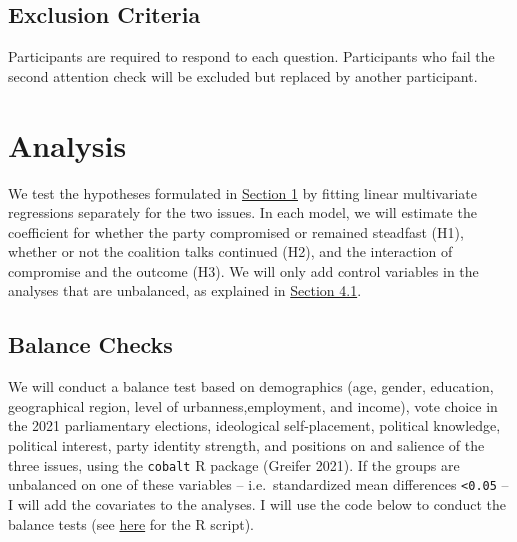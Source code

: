 \documentclass[]{article}
\begin{document}
\hypertarget{exclusion-criteria}{%
\subsection{Exclusion Criteria}\label{exclusion-criteria}}

Participants are required to respond to each question. Participants who
fail the second attention check will be excluded but replaced by another
participant.

\hypertarget{analysis}{%
\section{Analysis}\label{analysis}}

We test the hypotheses formulated in
\protect\hyperlink{expectations}{Section 1} by fitting linear
multivariate regressions separately for the two issues. In each model,
we will estimate the coefficient for whether the party compromised or
remained steadfast (H1), whether or not the coalition talks continued
(H2), and the interaction of compromise and the outcome (H3). We will
only add control variables in the analyses that are unbalanced, as
explained in \protect\hyperlink{balance-checks}{Section 4.1}.

\hypertarget{balance-checks}{%
\subsection{Balance Checks}\label{balance-checks}}

We will conduct a balance test based on demographics (age, gender,
education, geographical region, level of urbanness,employment, and
income), vote choice in the 2021 parliamentary elections, ideological
self-placement, political knowledge, political interest, party identity
strength, and positions on and salience of the three issues, using the
\texttt{cobalt} R package (Greifer 2021). If the groups are unbalanced
on one of these variables -- i.e.~standardized mean differences
\texttt{\textless{}0.05} -- I will add the covariates to the analyses. I
will use the code below to conduct the balance tests (see
\href{https://github.com/MarikenvdVelden/compromise-punish/tree/main/src/analysis/balance-test.R}{here}
for the R script).
\end{document}
